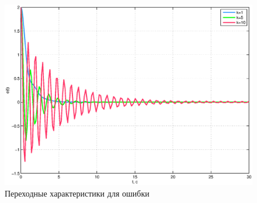 \documentclass[12pt,a4paper]{article}
\begin{document}
\begin{figure}[H]
	\centering
	\includegraphics[width=0.8\linewidth]{scheme/plot6.eps}
	\caption{Переходные характеристики для ошибки}
\end{figure}
\end{document}
